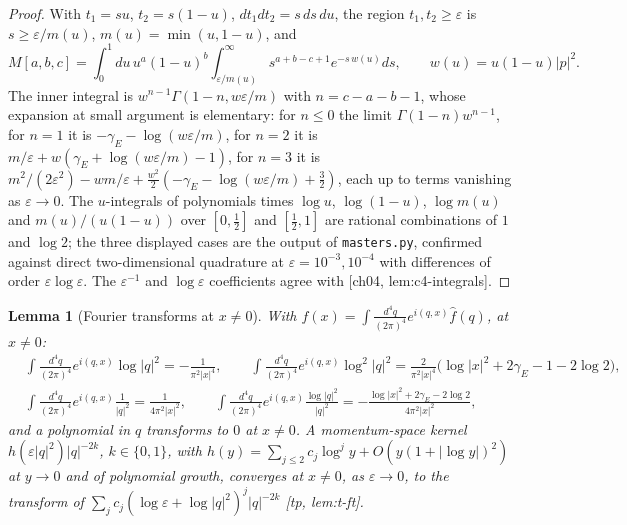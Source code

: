 \documentclass[11pt]{article}
\theoremstyle{plain}
\newtheorem{lemma}[theorem]{Lemma}
\theoremstyle{definition}
\numberwithin{equation}{section}
\begin{document}
\begin{proof}
With $t_1=su$, $t_2=s(1-u)$, $dt_1dt_2=s\,ds\,du$, the region $t_1,t_2\ge\varepsilon$ is $s\ge\varepsilon/m(u)$, $m(u)=\min(u,1-u)$, and
\[
M[a,b,c]=\int_0^1du\,u^a(1-u)^b\int_{\varepsilon/m(u)}^\infty s^{a+b-c+1}e^{-s\,w(u)}ds,\qquad w(u)=u(1-u)|p|^2 .
\]
The inner integral is $w^{n-1}\Gamma(1-n,w\varepsilon/m)$ with $n=c-a-b-1$, whose expansion at small argument is elementary: for $n\le0$ the limit $\Gamma(1-n)w^{n-1}$, for $n=1$ it is $-\gamma_E-\log(w\varepsilon/m)$, for $n=2$ it is $m/\varepsilon+w(\gamma_E+\log(w\varepsilon/m)-1)$, for $n=3$ it is $m^2/(2\varepsilon^2)-wm/\varepsilon+\tfrac{w^2}2(-\gamma_E-\log(w\varepsilon/m)+\tfrac32)$, each up to terms vanishing as $\varepsilon\to0$. The $u$-integrals of polynomials times $\log u$, $\log(1-u)$, $\log m(u)$ and $m(u)/(u(1-u))$ over $[0,\tfrac12]$ and $[\tfrac12,1]$ are rational combinations of $1$ and $\log2$; the three displayed cases are the output of \texttt{masters.py}, confirmed against direct two-dimensional quadrature at $\varepsilon=10^{-3},10^{-4}$ with differences of order $\varepsilon\log\varepsilon$. The $\varepsilon^{-1}$ and $\log\varepsilon$ coefficients agree with [ch04, lem:c4-integrals].
\end{proof}

\begin{lemma}[Fourier transforms at $x\ne0$]
\label{lem:fourier}
With $f(x)=\int\frac{d^4q}{(2\pi)^4}e^{i(q,x)}\hat f(q)$, at $x\ne0$:
\[
\begin{aligned}
&\int\tfrac{d^4q}{(2\pi)^4}e^{i(q,x)}\log|q|^2=-\frac{1}{\pi^2|x|^4},\qquad \int\tfrac{d^4q}{(2\pi)^4}e^{i(q,x)}\log^2|q|^2=\frac{2}{\pi^2|x|^4}\big(\log|x|^2+2\gamma_E-1-2\log2\big),\\
&\int\tfrac{d^4q}{(2\pi)^4}e^{i(q,x)}\frac{1}{|q|^2}=\frac{1}{4\pi^2|x|^2},\qquad \int\tfrac{d^4q}{(2\pi)^4}e^{i(q,x)}\frac{\log|q|^2}{|q|^2}=-\frac{\log|x|^2+2\gamma_E-2\log2}{4\pi^2|x|^2},
\end{aligned}
\]
and a polynomial in $q$ transforms to $0$ at $x\ne0$. A momentum-space kernel $h(\varepsilon|q|^2)|q|^{-2k}$, $k\in\{0,1\}$, with $h(y)=\sum_{j\le2}c_j\log^jy+O(y(1+|\log y|)^2)$ at $y\to0$ and of polynomial growth, converges at $x\ne0$, as $\varepsilon\to0$, to the transform of $\sum_jc_j(\log\varepsilon+\log|q|^2)^j|q|^{-2k}$ [tp, lem:t-ft].
\end{lemma}
\end{document}
